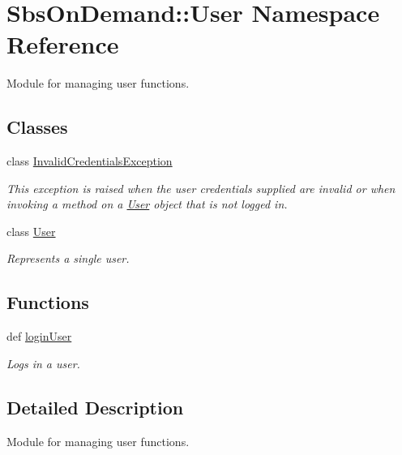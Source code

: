\hypertarget{namespace_sbs_on_demand_1_1_user}{
\section{\-Sbs\-On\-Demand\-:\-:\-User \-Namespace \-Reference}
\label{namespace_sbs_on_demand_1_1_user}
}


\-Module for managing user functions.  


\subsection*{\-Classes}
\begin{DoxyCompactItemize}
\item 
class \hyperlink{class_sbs_on_demand_1_1_user_1_1_invalid_credentials_exception}{\-Invalid\-Credentials\-Exception}
\begin{DoxyCompactList}\small\item\em \-This exception is raised when the user credentials supplied are invalid or when invoking a method on a \hyperlink{class_sbs_on_demand_1_1_user_1_1_user}{\-User} object that is not logged in. \end{DoxyCompactList}\item 
class \hyperlink{class_sbs_on_demand_1_1_user_1_1_user}{\-User}
\begin{DoxyCompactList}\small\item\em \-Represents a single user. \end{DoxyCompactList}\end{DoxyCompactItemize}
\subsection*{\-Functions}
\begin{DoxyCompactItemize}
\item 
def \hyperlink{namespace_sbs_on_demand_1_1_user_a71ea04bd994319fa5392992746833f36}{login\-User}
\begin{DoxyCompactList}\small\item\em \-Logs in a user. \end{DoxyCompactList}\end{DoxyCompactItemize}


\subsection{\-Detailed \-Description}
\-Module for managing user functions. 

